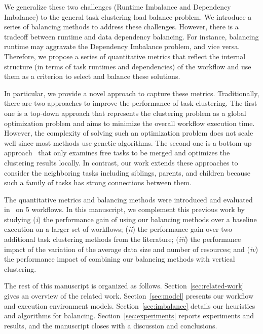 We generalize these two challenges (Runtime Imbalance and Dependency Imbalance) to the general task clustering load balance problem. We introduce a series of balancing methods to address these challenges. However, there is a tradeoff between runtime and data dependency balancing. For instance, balancing runtime may aggravate the Dependency Imbalance problem, and vice versa. Therefore, we propose a series of quantitative metrics that reflect the internal structure (in terms of task runtimes and dependencies) of the workflow and use them as a criterion to select and balance these solutions.

In particular, we provide a novel approach to capture these metrics. Traditionally, there are two approaches to improve the performance of task clustering. The first one is a top-down approach \cite{6217508} that represents the clustering problem as a global optimization problem and aims to minimize the overall workflow execution time. However, the complexity of solving such an optimization problem does not scale well since most methods use genetic algorithms. The second one is a bottom-up approach~\cite{Muthuvelu:2005:DJG:1082290.1082297,Liu2009} that only examines free tasks to be merged and optimizes the clustering results locally. In contrast, our work extends these approaches to consider the neighboring tasks including siblings, parents, and children because such a family of tasks has strong connections between them. 

The quantitative metrics and balancing methods were introduced and evaluated in~\cite{6683907} on 5 workflows. In this manuscript, we complement this previous work by studying (\emph{i}) the performance gain of using our balancing methods over a baseline execution on a larger set of workflows; (\emph{ii}) the performance gain over two additional task clustering methods from the literature; (\emph{iii}) the performance impact of the variation of the average data size and number of resources; and (\emph{iv}) the performance impact of combining our balancing methods with vertical clustering.

The rest of this manuscript is organized as follows. Section~\ref{sec:related-work} gives an overview of the related work. Section~\ref{sec:model} presents our workflow and execution environment models. Section~\ref{sec:imbalance} details our heuristics and algorithms for balancing. Section~\ref{sec:experiments} reports experiments and results, and the manuscript closes with a discussion and conclusions.


